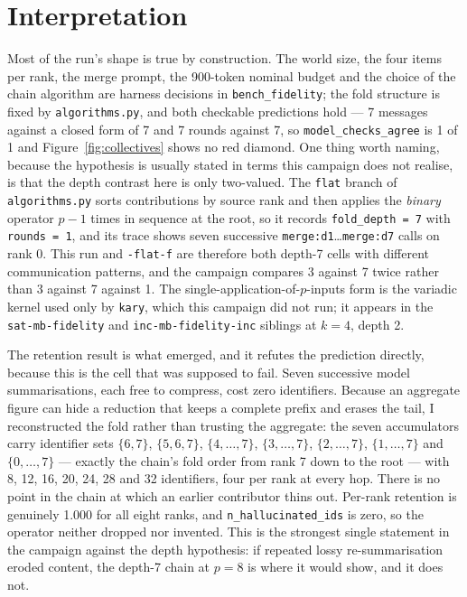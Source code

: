\documentclass[11pt]{article}
\begin{document}
\section{Interpretation}

Most of the run's shape is true by construction. The world size, the four items per
rank, the merge prompt, the 900-token nominal budget and the choice of the chain
algorithm are harness decisions in \texttt{bench\_fidelity}; the fold structure is fixed
by \texttt{algorithms.py}, and both checkable predictions hold --- 7 messages against a
closed form of 7 and 7 rounds against 7, so \texttt{model\_checks\_agree} is 1 of 1 and
Figure~\ref{fig:collectives} shows no red diamond. One thing worth naming, because the
hypothesis is usually stated in terms this campaign does not realise, is that the depth
contrast here is only two-valued. The \texttt{flat} branch of \texttt{algorithms.py}
sorts contributions by source rank and then applies the \emph{binary} operator $p-1$
times in sequence at the root, so it records \texttt{fold\_depth = 7} with
\texttt{rounds = 1}, and its trace shows seven successive
\texttt{merge:d1}\dots\texttt{merge:d7} calls on rank 0. This run and \texttt{-flat-f}
are therefore both depth-7 cells with different communication patterns, and the campaign
compares 3 against 7 twice rather than 3 against 7 against 1. The
single-application-of-$p$-inputs form is the variadic kernel used only by \texttt{kary},
which this campaign did not run; it appears in the \texttt{sat-mb-fidelity} and
\texttt{inc-mb-fidelity-inc} siblings at $k = 4$, depth 2.

The retention result is what emerged, and it refutes the prediction directly, because
this is the cell that was supposed to fail. Seven successive model summarisations, each
free to compress, cost zero identifiers. Because an aggregate figure can hide a
reduction that keeps a complete prefix and erases the tail, I reconstructed the fold
rather than trusting the aggregate: the seven accumulators carry identifier sets
$\{6,7\}$, $\{5,6,7\}$, $\{4,\dots,7\}$, $\{3,\dots,7\}$, $\{2,\dots,7\}$,
$\{1,\dots,7\}$ and $\{0,\dots,7\}$ --- exactly the chain's fold order from rank 7 down
to the root --- with 8, 12, 16, 20, 24, 28 and 32 identifiers, four per rank at every
hop. There is no point in the chain at which an earlier contributor thins out. Per-rank
retention is genuinely 1.000 for all eight ranks, and \texttt{n\_hallucinated\_ids} is
zero, so the operator neither dropped nor invented. This is the strongest single
statement in the campaign against the depth hypothesis: if repeated lossy
re-summarisation eroded content, the depth-7 chain at $p = 8$ is where it would show,
and it does not.
\end{document}
